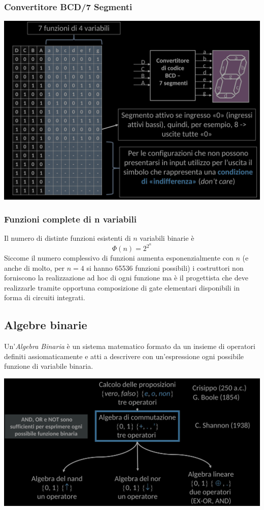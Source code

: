 \documentclass{article}
\begin{document}
\subsubsection*{Convertitore BCD/7 Segmenti}
\begin{center}
   \includegraphics[scale=0.34]{conv7.png}
\end{center}
\subsubsection{Funzioni complete di n variabili}
Il numero di distinte funzioni esistenti di $n$ variabili binarie è
$$  \Phi(n) = 2^{2^n} $$
Siccome il numero complessivo di funzioni aumenta esponenzialmente con $n$ (e anche di molto, per $n = 4$ si hanno 65536 funzioni possibili) i costruttori non forniscono la realizzazione ad hoc di ogni funzione ma è il progettista che deve realizzarle tramite
opportuna composizione di gate elementari disponibili in forma di circuiti integrati.
\subsection{Algebre binarie}
Un'\textit{Algebra Binaria} è un sistema matematico formato da un insieme di operatori definiti assiomaticamente e atti a descrivere con un'espressione ogni possibile funzione di variabile binaria.
\begin{center}
    \includegraphics[scale=0.33]{algmap.png}
\end{center}
\end{document}
